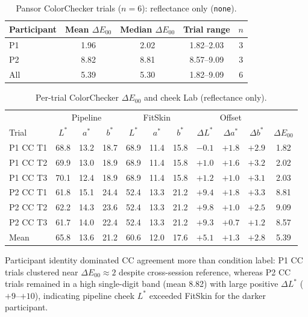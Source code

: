 \documentclass[11pt]{article}
\newcommand{\deee}{\ensuremath{\Delta E_{00}}}
\begin{document}
\begin{table}[htbp]
\centering
\caption{Pansor ColorChecker trials ($n=6$): reflectance only (\texttt{none}).}
\label{tab:pansor_cc_summary}
\begin{tabular}{l S[table-format=1.2] S[table-format=1.2] S[table-format=1.2] S[table-format=1.0]}
\toprule
{Participant} & {Mean $\deee$} & {Median $\deee$} & {Trial range} & {$n$} \\
\midrule
P1 & 1.96 & 2.02 & 1.82--2.03 & 3 \\
P2 & 8.82 & 8.81 & 8.57--9.09 & 3 \\
\midrule
All & 5.39 & 5.30 & 1.82--9.09 & 6 \\
\bottomrule
\end{tabular}
\end{table}

\begin{table}[htbp]
\centering
\caption{Per-trial ColorChecker $\deee$ and cheek Lab (reflectance only).}
\label{tab:pansor_cc_per_trial}
\small
\begin{tabular}{lcccccccccc}
\toprule
& \multicolumn{3}{c}{Pipeline} & \multicolumn{3}{c}{FitSkin} &
\multicolumn{3}{c}{Offset} & \\
\cmidrule(lr){2-4} \cmidrule(lr){5-7} \cmidrule(lr){8-10}
{Trial} & $L^*$ & $a^*$ & $b^*$ & $L^*$ & $a^*$ & $b^*$ &
$\Delta L^*$ & $\Delta a^*$ & $\Delta b^*$ & $\deee$ \\
\midrule
P1 CC T1 & 68.8 & 13.2 & 18.7 & 68.9 & 11.4 & 15.8 & $-0.1$ & $+1.8$ & $+2.9$ & 1.82 \\
P1 CC T2 & 69.9 & 13.0 & 18.9 & 68.9 & 11.4 & 15.8 & $+1.0$ & $+1.6$ & $+3.2$ & 2.02 \\
P1 CC T3 & 70.1 & 12.4 & 18.9 & 68.9 & 11.4 & 15.8 & $+1.2$ & $+1.0$ & $+3.1$ & 2.03 \\
P2 CC T1 & 61.8 & 15.1 & 24.4 & 52.4 & 13.3 & 21.2 & $+9.4$ & $+1.8$ & $+3.3$ & 8.81 \\
P2 CC T2 & 62.2 & 14.3 & 23.6 & 52.4 & 13.3 & 21.2 & $+9.8$ & $+1.0$ & $+2.5$ & 9.09 \\
P2 CC T3 & 61.7 & 14.0 & 22.4 & 52.4 & 13.3 & 21.2 & $+9.3$ & $+0.7$ & $+1.2$ & 8.57 \\
\midrule
Mean   & 65.8 & 13.6 & 21.2 & 60.6 & 12.0 & 17.6 & $+5.1$ & $+1.3$ & $+2.8$ & 5.39 \\
\bottomrule
\end{tabular}
\end{table}

Participant identity dominated CC agreement more than condition label: P1 CC trials clustered near $\deee \approx 2$ despite cross-session reference, whereas P2 CC trials remained in a high single-digit band (mean 8.82) with large positive $\Delta L^*$ ($+9$--$+10$), indicating pipeline cheek $L^*$ exceeded FitSkin for the darker participant.
\end{document}
